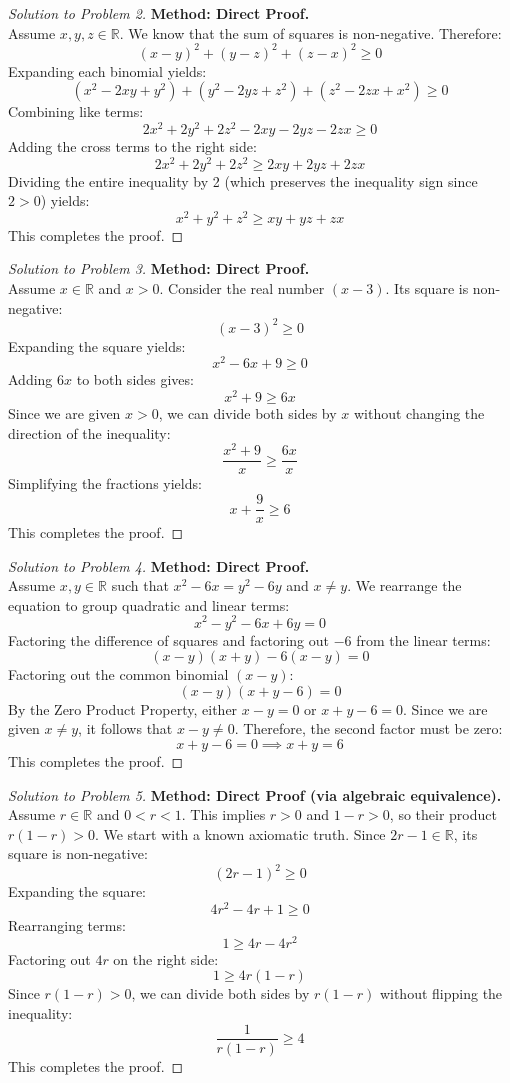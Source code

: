 \documentclass[11pt]{article}
\begin{document}
\begin{proof}[Solution to Problem 2]
    \textbf{Method: Direct Proof.} \\
    Assume $x, y, z \in \mathbb{R}$. We know that the sum of squares is non-negative. Therefore:
    \[ (x - y)^2 + (y - z)^2 + (z - x)^2 \ge 0 \]
    Expanding each binomial yields:
    \[ (x^2 - 2xy + y^2) + (y^2 - 2yz + z^2) + (z^2 - 2zx + x^2) \ge 0 \]
    Combining like terms:
    \[ 2x^2 + 2y^2 + 2z^2 - 2xy - 2yz - 2zx \ge 0 \]
    Adding the cross terms to the right side:
    \[ 2x^2 + 2y^2 + 2z^2 \ge 2xy + 2yz + 2zx \]
    Dividing the entire inequality by 2 (which preserves the inequality sign since $2 > 0$) yields:
    \[ x^2 + y^2 + z^2 \ge xy + yz + zx \]
    This completes the proof.
\end{proof}

\begin{proof}[Solution to Problem 3]
    \textbf{Method: Direct Proof.} \\
    Assume $x \in \mathbb{R}$ and $x > 0$. Consider the real number $(x - 3)$. Its square is non-negative:
    \[ (x - 3)^2 \ge 0 \]
    Expanding the square yields:
    \[ x^2 - 6x + 9 \ge 0 \]
    Adding $6x$ to both sides gives:
    \[ x^2 + 9 \ge 6x \]
    Since we are given $x > 0$, we can divide both sides by $x$ without changing the direction of the inequality:
    \[ \frac{x^2 + 9}{x} \ge \frac{6x}{x} \]
    Simplifying the fractions yields:
    \[ x + \frac{9}{x} \ge 6 \]
    This completes the proof.
\end{proof}

\begin{proof}[Solution to Problem 4]
    \textbf{Method: Direct Proof.} \\
    Assume $x, y \in \mathbb{R}$ such that $x^2 - 6x = y^2 - 6y$ and $x \neq y$. We rearrange the equation to group quadratic and linear terms:
    \[ x^2 - y^2 - 6x + 6y = 0 \]
    Factoring the difference of squares and factoring out $-6$ from the linear terms:
    \[ (x - y)(x + y) - 6(x - y) = 0 \]
    Factoring out the common binomial $(x - y)$:
    \[ (x - y)(x + y - 6) = 0 \]
    By the Zero Product Property, either $x - y = 0$ or $x + y - 6 = 0$. Since we are given $x \neq y$, it follows that $x - y \neq 0$. Therefore, the second factor must be zero:
    \[ x + y - 6 = 0 \implies x + y = 6 \]
    This completes the proof.
\end{proof}

\begin{proof}[Solution to Problem 5]
    \textbf{Method: Direct Proof (via algebraic equivalence).} \\
    Assume $r \in \mathbb{R}$ and $0 < r < 1$. This implies $r > 0$ and $1 - r > 0$, so their product $r(1 - r) > 0$. We start with a known axiomatic truth. Since $2r - 1 \in \mathbb{R}$, its square is non-negative:
    \[ (2r - 1)^2 \ge 0 \]
    Expanding the square:
    \[ 4r^2 - 4r + 1 \ge 0 \]
    Rearranging terms:
    \[ 1 \ge 4r - 4r^2 \]
    Factoring out $4r$ on the right side:
    \[ 1 \ge 4r(1 - r) \]
    Since $r(1 - r) > 0$, we can divide both sides by $r(1 - r)$ without flipping the inequality:
    \[ \frac{1}{r(1 - r)} \ge 4 \]
    This completes the proof.
\end{proof}
\end{document}
